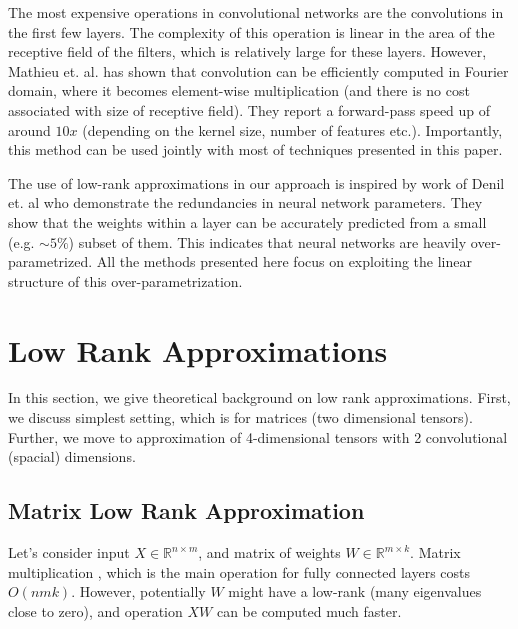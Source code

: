 \documentclass{article}
\begin{document}



The most expensive operations in convolutional networks are the
convolutions in the first few layers. The complexity of this operation
is linear in the area of the receptive field of the filters, which is
relatively large for these layers.  However, Mathieu
et. al. \cite{mathieu2013fast} has shown that convolution can be
efficiently computed in Fourier domain, where it becomes element-wise
multiplication (and there is no cost associated with size of receptive
field). They report a forward-pass speed up of around $10x$ (depending on
the kernel size, number of features etc.).  Importantly, this method can
be used jointly with most of techniques presented in this paper.

The use of low-rank approximations in our approach is inspired by work
of Denil et. al \cite{denil2013predicting} who demonstrate the redundancies in neural
network parameters. They show that the weights within a layer can be
accurately predicted from a small (e.g. $\sim 5\%$) subset of them. This
indicates that neural networks are heavily over-parametrized.  All the
methods presented here focus on exploiting the linear structure of this
over-parametrization.


\section{Low Rank Approximations}
In this section, we give theoretical background on low rank approximations. First, we discuss simplest setting, which is
for matrices (two dimensional tensors). Further, we move to approximation of 4-dimensional tensors with 2 convolutional (spacial)
dimensions.


\subsection{Matrix Low Rank Approximation}
Let's consider input $X \in \mathbb{R}^{n \times m}$, and matrix of weights $W \in \mathbb{R}^{m \times k}$. Matrix multiplication
, which is the main operation for fully connected layers costs $O(nmk)$. However, potentially $W$ might have a low-rank (many 
eigenvalues close to zero), and operation $XW$ can be computed much faster. 
\end{document}
